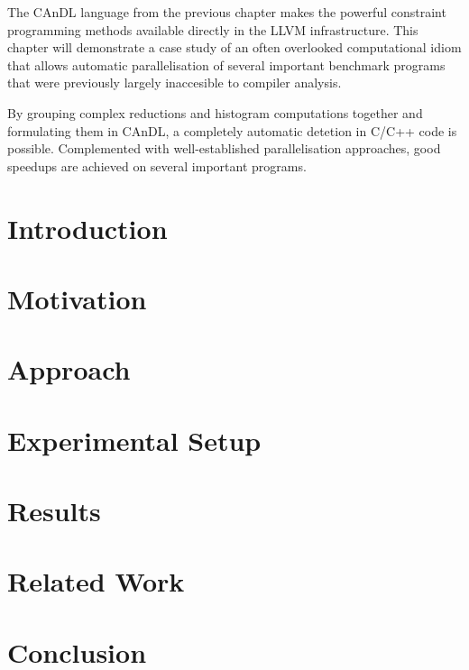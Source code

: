 
    The CAnDL language from the previous chapter makes the powerful constraint
    programming methods available directly in the LLVM infrastructure.
    This chapter will demonstrate a case study of an often overlooked
    computational idiom that allows automatic parallelisation of several
    important benchmark programs that were previously largely inaccesible to
    compiler analysis.

    By grouping complex reductions and histogram computations together and
    formulating them in CAnDL, a completely automatic detetion in C/C++ code is
    possible.
    Complemented with well-established parallelisation approaches, good speedups
    are achieved on several important programs.

\section{Introduction}
\section{Motivation}

\section{Approach}

\section{Experimental Setup}

\section{Results}

\section{Related Work}

\section{Conclusion}